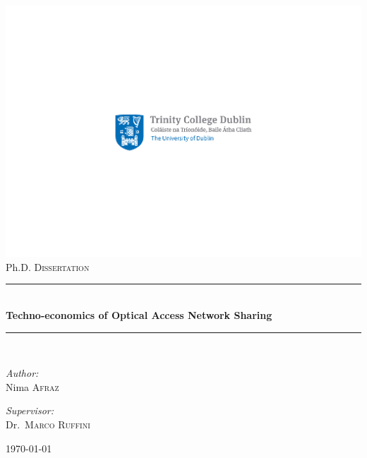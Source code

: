 \begin{titlepage}

\begin{center}



\includegraphics{img/bilingual_logo}\\[2.5cm]


{\Large Ph.D. \textsc{Dissertation}}\\[0.5cm]

\newcommand{\HRule}{\rule{\linewidth}{0.5mm}} %

\HRule \\[1cm]
{ \huge \bfseries {Techno-economics of Optical Access Network Sharing}}\\[1cm]
\HRule \\[1.5cm]

\vspace{2cm}
\begin{minipage}{0.4\textwidth}
\begin{flushleft} \large
\emph{Author:}\\
Nima \textsc{Afraz}
\end{flushleft}
\end{minipage}
\begin{minipage}{0.4\textwidth}
\begin{flushright} \large
\emph{Supervisor:} \\
Dr.~\textsc{Marco Ruffini\\}
\end{flushright}
\end{minipage}

\vfill

{\large \today}

\end{center}

\end{titlepage}
